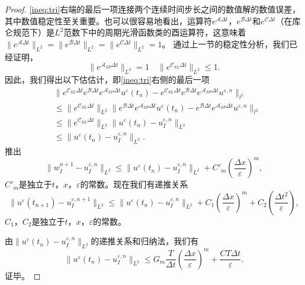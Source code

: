 \begin{proof}
	\eqref{ineq:tri}右端的最后一项连接两个连续时间步长之间的数值解的数值误差，其中数值稳定性至关重要。也可以很容易地看出，运算符$e^{\mathcal{A}\Delta t}$，$e^{\mathcal{B}\Delta t}$和$e^{\mathcal{C}\Delta t}$（在库仑规范下）是$L^2$范数下中的周期光滑函数类的酉运算符，这意味着$\|e^{\mathcal{A}\Delta t}\|_{L^2}=\|e^{\mathcal{B}\Delta t}\|_{L^2}=\|e^{\mathcal{C}\Delta t}\|_{L^2}=1$。 通过上一节的稳定性分析，我们已经证明，
	\[
	\|e^{\mathcal{A}_{SP}\Delta t}\|_{L^2}= 1\quad \|e^{\mathcal{C}_{SL}\Delta t}\|_{L^2}\leq 1.
	\] 
    因此，我们得出以下估估计，即\eqref{ineq:tri}右侧的最后一项
	\begin{align}
	&\|e^{\mathcal{C}_{SL}\Delta t}e^{\mathcal{B}\Delta t}e^{\mathcal{A}_{SP}\Delta t}u^\varepsilon(t_n)-e^{\mathcal{C}_{SL}\Delta t}e^{\mathcal{B}\Delta t}e^{\mathcal{A}_{SP}\Delta t}u^{\varepsilon,n}\|_{l^2} \nonumber\\
	&\leq \|e^{\mathcal{C}_{SL}\Delta t}\|_{L^2}\|e^{\mathcal{B}\Delta t}e^{\mathcal{A}_{SP}\Delta t}u^\varepsilon(t_n)-e^{\mathcal{B}\Delta t}e^{\mathcal{A}_{SP}\Delta t}u^{\varepsilon,n}\|_{l^2} \nonumber\\
	&\leq \|e^{\mathcal{C}_{SL}\Delta t}\|_{L^2}\|u^\varepsilon(t_n)-u^{\varepsilon,n}_I\|_{L^2} \nonumber\\
	&\leq \|u^\varepsilon(t_n)-u^{\varepsilon,n}_I\|_{L^2}.
	\end{align}
	推出
	\begin{equation}
	\|w^{n+1}_I-u^{\varepsilon,n}_I\|_{L^2}\leq \|u^\varepsilon(t_n)-u^{\varepsilon,n}_I\|_{L^2}+C'_m\left(\frac{\Delta x}{\varepsilon}\right)^m,
	\end{equation}
	$C'_m$是独立于$t$，$x$，$\varepsilon$的常数。现在我们有递推关系
	\begin{equation}
	\|u^\varepsilon(t_{n+1})-u^{\varepsilon,n+1}_I\|_{L^2}\leq \|u^\varepsilon(t_n)-u^{\varepsilon,n}_I\|_{L^2}+C_1(\frac{\Delta x}{\varepsilon})^m+C_2(\frac{\Delta t^2}{\varepsilon}),
	\end{equation}
	$C_1$，$C_2$是独立于$t$，$x$，$\varepsilon$的常数。
	
	由$\|u^\varepsilon(t_n)-u^{\varepsilon,n}_I\|_{L^2}$的递推关系和归纳法，我们有
	\begin{equation}
	\|u^\varepsilon(t_n)-u^{\varepsilon,n}_I\|_{L^2}\leq G_m\frac{T}{\Delta t}(\frac{\Delta x}{\varepsilon})^m+\frac{CT\Delta t}{\varepsilon}.
	\end{equation}
	证毕。	
\end{proof}

